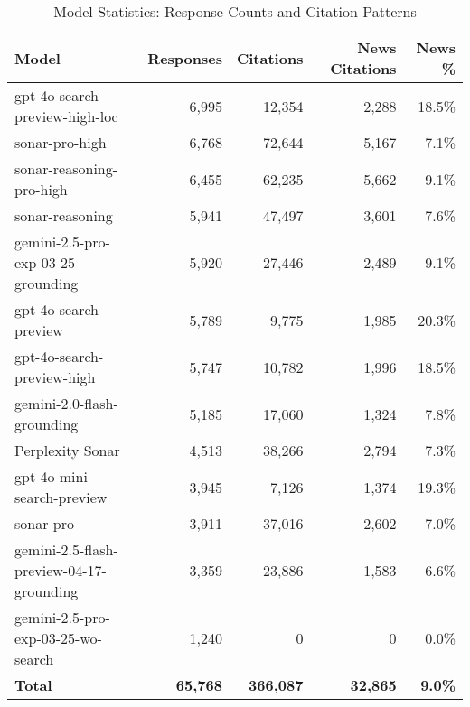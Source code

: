 \begin{table}[htbp]
\caption{Model Statistics: Response Counts and Citation Patterns}
\label{tab:model_stats}
\begin{tabular}{lrrrr}
\toprule
Model & Responses & Citations & News Citations & News \% \\
\midrule
gpt-4o-search-preview-high-loc & 6,995 & 12,354 & 2,288 & 18.5\% \\
sonar-pro-high & 6,768 & 72,644 & 5,167 & 7.1\% \\
sonar-reasoning-pro-high & 6,455 & 62,235 & 5,662 & 9.1\% \\
sonar-reasoning & 5,941 & 47,497 & 3,601 & 7.6\% \\
gemini-2.5-pro-exp-03-25-grounding & 5,920 & 27,446 & 2,489 & 9.1\% \\
gpt-4o-search-preview & 5,789 & 9,775 & 1,985 & 20.3\% \\
gpt-4o-search-preview-high & 5,747 & 10,782 & 1,996 & 18.5\% \\
gemini-2.0-flash-grounding & 5,185 & 17,060 & 1,324 & 7.8\% \\
Perplexity Sonar & 4,513 & 38,266 & 2,794 & 7.3\% \\
gpt-4o-mini-search-preview & 3,945 & 7,126 & 1,374 & 19.3\% \\
sonar-pro & 3,911 & 37,016 & 2,602 & 7.0\% \\
gemini-2.5-flash-preview-04-17-grounding & 3,359 & 23,886 & 1,583 & 6.6\% \\
gemini-2.5-pro-exp-03-25-wo-search & 1,240 & 0 & 0 & 0.0\% \\
\midrule
\textbf{Total} & \textbf{65,768} & \textbf{366,087} & \textbf{32,865} & \textbf{9.0\%} \\
\bottomrule
\end{tabular}
\end{table}
